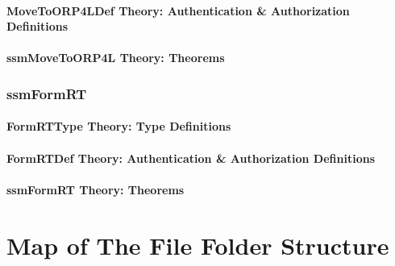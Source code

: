 \documentclass[hidelinks,12pt,a4paper]{report}
\begin{document}
\begin{appendices}
\subsubsection{MoveToORP4LDef Theory: Authentication \& Authorization Definitions}
\subsubsection{ssmMoveToORP4L Theory: Theorems}

\subsection{ssmFormRT}
\subsubsection{FormRTType Theory: Type Definitions}
\subsubsection{FormRTDef Theory: Authentication \& Authorization Definitions}
\subsubsection{ssmFormRT Theory: Theorems}

\chapter{Map of The File Folder Structure}\label{foldermap}

\end{appendices}\cleardoublepage



\doublespacing
\end{document}
